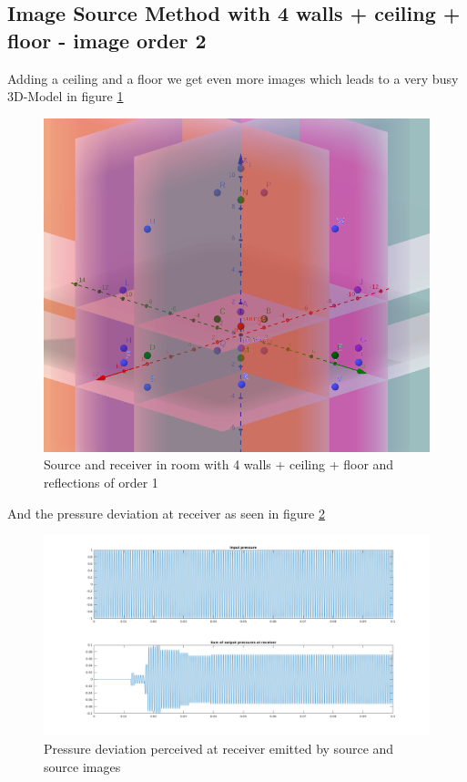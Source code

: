 \subsection{Image Source Method with 4 walls + ceiling + floor - image order 2}
Adding a ceiling and a floor we get even more images which leads to a very busy 3D-Model in figure \ref{fig:ism_4_2_2_geo}\\
\begin{figure}
    \centerline{\includegraphics[width=1\textwidth,keepaspectratio]{LaTeX/images/geometrie/ism_4_walls_2_order_2.png}}
    \caption{Source and receiver in room with 4 walls + ceiling + floor and reflections of order 1}
    \label{fig:ism_4_2_2_geo}
\end{figure}
And the pressure deviation at receiver as seen in figure \ref{fig:ism_4_2_2_mat}
\begin{figure}

    \centerline{\includegraphics[width=1.5\textwidth,keepaspectratio]{LaTeX/images/plots/matlab_4_walls_2_order_2.png}}
    \caption{Pressure deviation perceived at receiver emitted by source and source images}
    \label{fig:ism_4_2_2_mat}
\end{figure}

